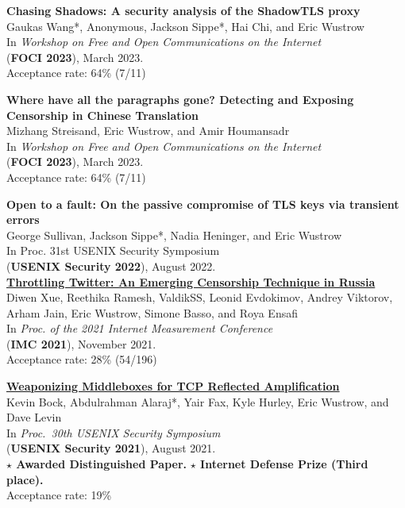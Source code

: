\documentclass[margin,11pt]{res} %
\begin{document}
    \textbf{Chasing Shadows: A security analysis of the ShadowTLS proxy} \\
    Gaukas Wang*, Anonymous, Jackson Sippe*, Hai Chi, and Eric Wustrow \\
    In \emph{Workshop on Free and Open Communications on the Internet} \\
    (\textbf{FOCI 2023}), March 2023. \\
    Acceptance rate: 64\% (7/11)

    \textbf{Where have all the paragraphs gone? Detecting and Exposing Censorship in Chinese Translation} \\
    Mizhang Streisand, Eric Wustrow, and Amir Houmansadr \\
    In \emph{Workshop on Free and Open Communications on the Internet} \\
    (\textbf{FOCI 2023}), March 2023. \\
    Acceptance rate: 64\% (7/11)

    \textbf{Open to a fault: On the passive compromise of TLS keys via transient errors} \\
    George Sullivan, Jackson Sippe*, Nadia Heninger, and Eric Wustrow \\
    In {Proc. 31st USENIX Security Symposium} \\
    (\textbf{USENIX Security 2022}), August 2022. \\

    \textbf{\href{https://throttletwitter.com/}{Throttling Twitter: An Emerging Censorship Technique in Russia}} \\
    Diwen Xue, Reethika Ramesh, ValdikSS, Leonid Evdokimov, Andrey Viktorov, Arham Jain, Eric Wustrow, Simone Basso, and Roya Ensafi \\
    In \emph{Proc. of the 2021 Internet Measurement Conference} \\
    (\textbf{IMC 2021}), November 2021. \\
    Acceptance rate: 28\% (54/196)

    \textbf{\href{https://geneva.cs.umd.edu/posts/usenix21-weaponizing-censors/}{Weaponizing Middleboxes for TCP Reflected Amplification}} \\
    Kevin Bock, Abdulrahman Alaraj*, Yair Fax, Kyle Hurley, Eric Wustrow, and Dave Levin \\
    In \emph{Proc.\ 30th USENIX Security Symposium} \\
    (\textbf{USENIX Security 2021}), August 2021. \\
    \textbf{$\star$ Awarded Distinguished Paper.} 
    \textbf{$\star$ Internet Defense Prize (Third place).} \\
    Acceptance rate: 19\% %
\end{document}
